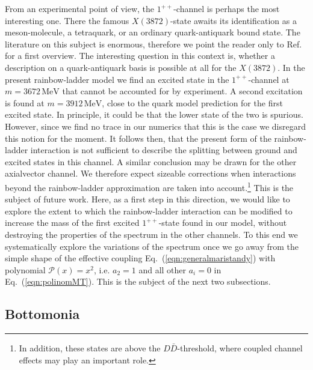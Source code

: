 From an experimental point of view, the $1^{++}$-channel is perhaps the most interesting
one. There the famous $X(3872)$-state awaits its identification as a meson-molecule,
a tetraquark, or an ordinary quark-antiquark bound state. The literature on this
subject is enormous, therefore we point the reader only to Ref.~\cite{Bodwin:2013nua} 
for a first overview. The interesting question in this context is, whether a description
on a quark-antiquark basis is possible at all for the $X(3872)$. In the present
rainbow-ladder model we find an excited state in the $1^{++}$-channel at 
$m = 3672 \,\mbox{MeV}$ that cannot be accounted for by experiment. A second excitation 
is found at $m = 3912 \,\mbox{MeV}$, close to the quark model prediction for the first
excited state. In principle, it could be that the lower state of the two is spurious.
However, since we find no trace in our numerics that this is the case we disregard this
notion for the moment. It follows then, that the present form of the rainbow-ladder 
interaction is not sufficient to describe the splitting between ground and excited states
in this channel. A similar conclusion may be drawn for the other axialvector channel.
We therefore expect sizeable corrections when interactions beyond the 
rainbow-ladder approximation are taken into account.\footnote{In addition, these states are above 
the $D\bar{D}$-threshold, where coupled channel effects may play an important role.}
This is the subject of future work. 
Here, as a first
step in this direction, we would like to explore the extent to which the rainbow-ladder 
interaction can be modified to increase the mass of the first excited $1^{++}$-state found 
in our model, without destroying the properties of the spectrum in the other channels. 
To this end we systematically explore the variations of the spectrum once we go away 
from the simple shape of the effective coupling Eq.~(\ref{eqn:generalmaristandy}) with 
polynomial $\mathcal{P}(x) = x^2$, i.e. $a_2=1$ and all other $a_i=0$ in 
Eq.~(\ref{eqn:polinomMT}). This is the subject of the next two subsections.
   
%
%
%
%

%
%
%
\subsection{Bottomonia}\label{sec:bottom}

